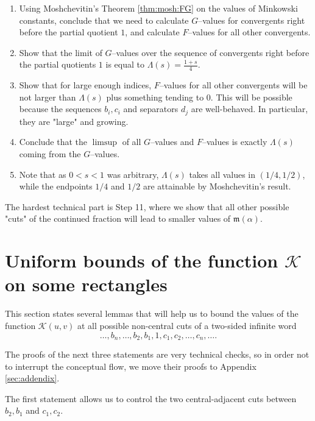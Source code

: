 \documentclass[11pt]{amsart}
\newcommand{\Kfun}{\mathcal K}
\begin{document}
\begin{enumerate}
\item Using Moshchevitin's Theorem \ref{thm:mosh:FG} on the values of Minkowski constants, conclude that we need to calculate $G$--values for convergents right before the partial quotient $1$, and calculate $F$--values for all other convergents.

\item Show that the limit of $G$--values over the sequence of convergents right before the partial quotients $1$ is equal to $\Lambda(s)=\frac{1+s}{4}$.

\item Show that for large enough indices, $F$--values for all other convergents will be not larger than $\Lambda(s)$ plus something tending to $0$. This will be possible because the sequences $b_i,c_i$ and separators $d_j$ are well-behaved. In particular, they are "large" and growing.

\item Conclude that the $\limsup$ of all $G$--values and $F$--values is exactly $\Lambda(s)$ coming from the $G$--values.

\item Note that as $0<s<1$ was arbitrary, $\Lambda(s)$ takes all values in $(1/4,1/2)$, while the endpoints $1/4$ and $1/2$ are attainable by Moshchevitin's result.
\end{enumerate}

The hardest technical part is Step 11, where we show that all other possible "cuts" of the continued fraction will lead to smaller values of $\mathfrak{m}(\alpha)$.




\section{Uniform bounds of the function $\Kfun$ on some rectangles}
This section states several lemmas that will help us to bound the values of the function $\Kfun(u,v)$ at all possible non-central cuts of a two-sided infinite word 
$$\ldots,b_n,\ldots,b_2,b_1,1,c_1,c_2,\ldots,c_n,\ldots.$$

The proofs of the next three statements are very technical checks, so in order not to interrupt the conceptual flow, we move their proofs to Appendix \ref{sec:addendix}. 

The first statement allows us to control the two central-adjacent cuts between $b_2,b_1$ and $c_1,c_2$.
\end{document}
